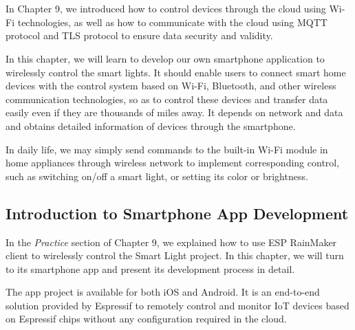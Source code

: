 \documentclass[a4paper,12pt]{book}
\begin{document}

\chapter[Smartphone App Development]{}

\vspace{36pt}
In Chapter 9, we introduced how to control devices through the cloud using Wi-Fi technologies, as well as how to communicate with the cloud using MQTT protocol and TLS protocol to ensure data security and validity.

In this chapter, we will learn to develop our own smartphone application to wirelessly control the smart lights. It should enable users to connect smart home devices with the control system based on Wi-Fi, Bluetooth, and other wireless communication technologies, so as to control these devices and transfer data easily even if they are thousands of miles away. It depends on network and data and obtains detailed information of devices through the smartphone.

In daily life, we may simply send commands to the built-in Wi-Fi module in home appliances through wireless network to implement corresponding control, such as switching on/off a smart light, or setting its color or brightness.

\section{Introduction to Smartphone App Development}
In the \textit{Practice} section of Chapter 9, we explained how to use ESP RainMaker client to wirelessly control the Smart Light project. In this chapter, we will turn to its smartphone app and present its development process in detail.

The app project is available for both iOS and Android. It is an end-to-end solution provided by Espressif to remotely control and monitor IoT devices based on Espressif chips without any configuration required in the cloud.

\end{document}
